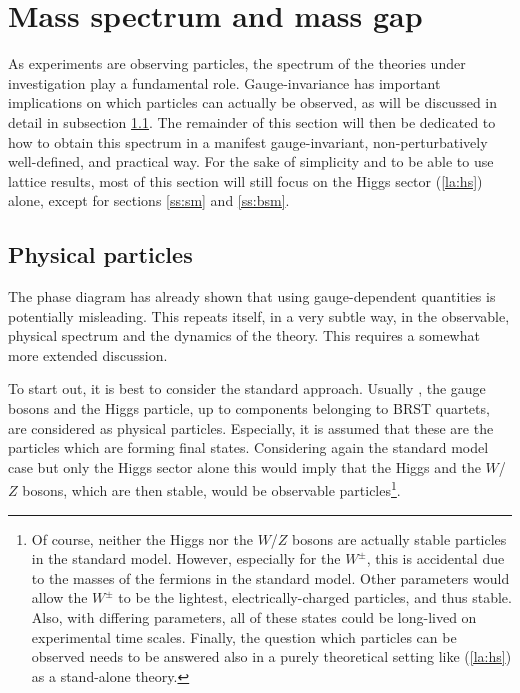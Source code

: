 \documentclass[final,12pt]{article}
\newcommand*{\pref}[1]{(\ref{#1})}
\newcommand*{\1}{1\!\!\!\bot}
\begin{document}
\section{Mass spectrum and mass gap}\label{s:spectrum}

As experiments are observing particles, the spectrum of the theories under investigation play a fundamental role. Gauge-invariance has important implications on which particles can actually be observed, as will be discussed in detail in subsection \ref{ss:physstates}. The remainder of this section will then be dedicated to how to obtain this spectrum in a manifest gauge-invariant, non-perturbatively well-defined, and practical way. For the sake of simplicity and to be able to use lattice results, most of this section will still focus on the Higgs sector \pref{la:hs} alone, except for sections \ref{ss:sm} and \ref{ss:bsm}.

\subsection{Physical particles}\label{ss:physstates}

The phase diagram has already shown that using gauge-dependent quantities is potentially misleading. This repeats itself, in a very subtle way, in the observable, physical spectrum and the dynamics of the theory. This requires a somewhat more extended discussion.

To start out, it is best to consider the standard approach. Usually \cite{Bohm:2001yx}, the gauge bosons and the Higgs particle, up to components belonging to BRST quartets, are considered as physical particles. Especially, it is assumed that these are the particles which are forming final states. Considering again the standard model case but only the Higgs sector alone this would imply that the Higgs and the $W$/$Z$ bosons, which are then stable, would be observable particles\footnote{Of course, neither the Higgs nor the $W$/$Z$ bosons are actually stable particles in the standard model. However, especially for the $W^\pm$, this is accidental due to the masses of the fermions in the standard model. Other parameters would allow the $W^\pm$ to be the lightest, electrically-charged particles, and thus stable. Also, with differing parameters, all of these states could be long-lived on experimental time scales. Finally, the question which particles can be observed needs to be answered also in a purely theoretical setting like \pref{la:hs} as a stand-alone theory.}.
\end{document}
